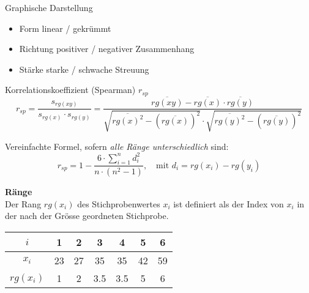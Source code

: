 \begin{concept}{Graphische Darstellung}\\
\begin{itemize}
 \item Form \hspace{1.5cm} linear / gekrümmt
 \item Richtung \hspace{0.85cm} positiver / negativer Zusammenhang  
 \item Stärke \hspace{1.2cm} starke / schwache Streuung
\end{itemize}
\end{concept}
\begin{definition}{Korrelationskoeffizient (Spearman) $r_{sp}$}\\
$$r_{sp} = \frac{s_{rg(xy)}}{s_{rg(x)} \cdot s_{rg(y)}} = \frac{\overline{rg(xy)} - \overline{rg(x)} \cdot \overline{rg(y)}}{\sqrt{\overline{rg(x)^2} - (\overline{rg(x)})^2} \cdot \sqrt{\overline{rg(y)^2} - (\overline{rg(y)})^2}}$$

Vereinfachte Formel, sofern \emph{alle Ränge unterschiedlich} sind:
$$r_{sp} = 1 - \frac{6 \cdot \sum_{i=1}^n d_i^2}{n \cdot (n^2 - 1)}, \quad \text{mit } d_i = rg(x_i) - rg(y_i)$$

\textbf{Ränge}\\
Der Rang $rg(x_i)$ des Stichprobenwertes $x_i$ ist definiert als der Index von $x_i$ in der nach der Grösse geordneten Stichprobe.

\begin{center}
\begin{tabular}{|c|c|c|c|c|c|c|}
\hline
$i$ & 1 & 2 & 3 & 4 & 5 & 6 \\
\hline
$x_i$ & 23 & 27 & 35 & 35 & 42 & 59 \\
\hline
$rg(x_i)$ & 1 & 2 & 3.5 & 3.5 & 5 & 6 \\
\hline
\end{tabular}
\end{center}
\end{definition}
